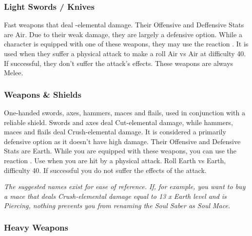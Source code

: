 \subsubsection{Light Swords / Knives}

Fast weapons that deal -elemental damage.  Their Offensive and Deffensive Stats are Air.  Due to their weak damage, they are largely a defensive option.  While a character is equipped with one of these weapons, they may use the reaction .  It is used when they suffer a physical attack to make a roll Air vs Air at difficulty 40.  If successful, they don't suffer the attack's effects.  These weapons are always Melee.

\begin{tabwpn}[label=inv-lsword,range=melee,type=physical,element=puncture,roll=airvair]
    
\end{tabwpn}
\clearpage

\subsubsection{Weapons \& Shields}

One-handed swords, axes, hammers, maces and flails, used in conjunction with a reliable shield. Swords and axes deal Cut-elemental damage, while hammers, maces and flails deal Crush-elemental damage. It is considered a primarily defensive option as it doesn’t have high damage. Their Offensive and Defensive Stats are Earth. While you are equipped with these weapons, you can use the reaction . Use when you are hit by a physical attack. Roll Earth vs Earth, difficulty 40. If successful you do not suffer the effects of the attack.

\begin{tabwpn}[label=inv-hwpnshld,range=melee,type=physical,element=crush / cut,roll=earthvearth]
    
\end{tabwpn}
{\footnotesize\textit{The suggested names exist for ease of reference. If, for example, you want to buy a mace that deals Crush-elemental damage equal to 13 x Earth level and is Piercing, nothing prevents you from renaming the Soul Saber as Soul Mace.}}
\clearpage

\subsubsection{Heavy Weapons}

